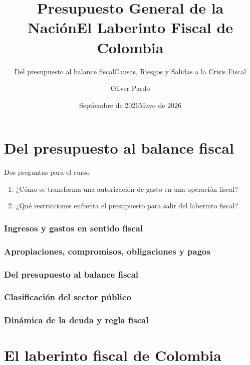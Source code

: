 \documentclass[aspectratio=169,10pt]{beamer}
\title{Presupuesto General de la Nación}
\subtitle{Del presupuesto al balance fiscal}
\author{Oliver Pardo}
\institute{Pontificia Universidad Javeriana}
\date{Septiembre de 2026}
\begin{document}
\part{Del presupuesto al balance fiscal}
\begin{frame}
  \titlepage
\end{frame}
\begin{frame}{Dos preguntas para el curso}
\begin{enumerate}
  \item ¿Cómo se transforma una autorización de gasto en una operación fiscal?
  \vspace{1em}
  \item ¿Qué restricciones enfrenta el presupuesto para salir del laberinto fiscal?
\end{enumerate}
\end{frame}
\section{Ingresos y gastos en sentido fiscal}

\section{Apropiaciones, compromisos, obligaciones y pagos}

\section{Del presupuesto al balance fiscal}





\section{Clasificación del sector público}

\section{Dinámica de la deuda y regla fiscal}


\part{El laberinto fiscal de Colombia}
\title{\Large El Laberinto Fiscal de Colombia}
\subtitle{Causas, Riesgos y Salidas a la Crisis Fiscal}
\date{Mayo de 2026}

\end{document}
